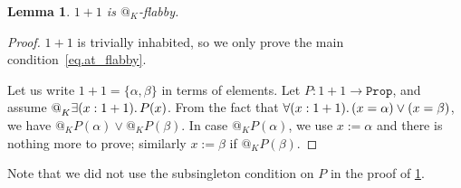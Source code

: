 \documentclass[11pt, oneside, article]{memoir}
\makeatletter
\theoremstyle{plain}
\newtheorem{lemma}[theorem]{Lemma}
\theoremstyle{definition}
\theoremstyle{remark}
\newcommand{\const}[1]{\mathtt{#1}}
\newcommand{\Prop}{\const{Prop}}
\newcommand{\AtSymbol}{{@}}
\newcommand{\At}[2][]{\AtSymbol^{#1}_{#2}}
\newcommand{\imp}{\Rightarrow}
\makeatother
\begin{document}
\begin{lemma}\label{lemma.11_flabby}
	$1 + 1$ is $\At{K}$-flabby.
	\label{lem.11_at_flabby}
\end{lemma}

\begin{proof}
	$1 + 1$ is trivially inhabited, so we only prove the main condition~\eqref{eq.at_flabby}.

	Let us write $1 + 1 = \{\alpha,\beta\}$ in terms of elements. Let $P : 1 + 1 \to \Prop$, and assume $\At{K}\exists(x:1+1)\ldotp P(x)$. From the fact that $\forall(x:1+1)\ldotp (x=\alpha)\vee (x=\beta)$, we have $\At{K}P(\alpha)\vee \At{K}P(\beta)$.
	In case $\At{K} P(\alpha)$, we use $x := \alpha$ and there is nothing more to prove; similarly $x := \beta$ if $\At{K} P(\beta)$. %
\end{proof}
Note that we did not use the subsingleton condition on $P$ in the proof of \cref{lemma.11_flabby}.

\end{document}
